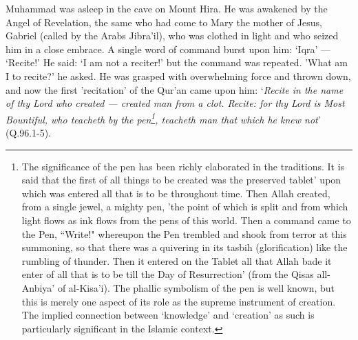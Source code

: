 \documentclass[10pt, twoside,openright]{book}
\begin{document}
Muhammad was asleep in the cave on Mount Hira. He was awakened by the Angel of Revelation, the same who had come to Mary the mother of Jesus, Gabriel (called by the Arabs Jibra'il), who was clothed in light and who seized him in a close embrace. A single word of command burst upon him: `Iqra' --- 
`Recite!' He said: `I am not a reciter!' but the command was repeated. 'What am I to recite?' he 
asked. He was grasped with overwhelming force and thrown down, and now the first 'recitation' of the 
Qur'an came upon him: `\emph{Recite in the name of thy Lord who created --- created man from a clot. Recite: for thy Lord is Most Bountiful, who teacheth by the pen\footnote{The significance of the pen has been richly elaborated in the traditions. It is said that the first of all things to be created was the preserved tablet' upon which was entered all that is to be throughout time. Then Allah created, from a single jewel, a mighty pen, 'the point of which is split and from which light flows as ink flows from the pens of this world. Then a command came to the Pen, ``Write!" whereupon the Pen trembled and shook from terror at this summoning, so that there was a quivering in its tasbih (glorification) like the rumbling of thunder. Then it entered on the Tablet all that Allah bade it enter of all that is to be till the Day of Resurrection' (from the Qisas all\hyp{}Anbiya' of al\hyp{}Kisa'i). The phallic symbolism of the pen is well known, but this is merely one aspect of its role as the supreme instrument of creation. The implied connection between `knowledge' and `creation' as such is particularly significant in the Islamic context.}, teacheth man that which he knew 
not}' (Q.96.1-5). \\
\end{document}
